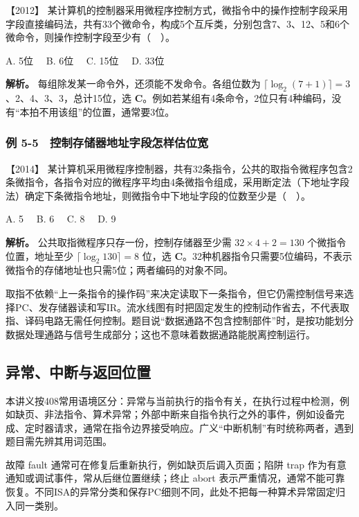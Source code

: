 \noindent{}【2012】 某计算机的控制器采用微程序控制方式，微指令中的操作控制字段采用字段直接编码法，共有33个微命令，构成5个互斥类，分别包含7、3、12、5和6个微命令，则操作控制字段至少有（　）。

A. 5位　 B. 6位　 C. 15位　 D. 33位


\textbf{解析。} 每组除发某一命令外，还须能不发命令。各组位数为 \(\lceil\log_2(7+1)\rceil=3\)、2、4、3、3，总计15位，选 \textbf{C}。例如若某组有4条命令，2位只有4种编码，没有``本拍不用该组''的位置，通常要3位。

\subsubsection{例 5-5　控制存储器地址字段怎样估位宽}\label{co-ex5-5}

\noindent{}【2014】 某计算机采用微程序控制器，共有32条指令，公共的取指令微程序包含2条微指令，各指令对应的微程序平均由4条微指令组成，采用断定法（下地址字段法）确定下条微指令地址，则微指令中下地址字段的位数至少是（　）。

A. 5　 B. 6　 C. 8　 D. 9


\textbf{解析。} 公共取指微程序只存一份，控制存储器至少需 \(32\times4+2=130\) 个微指令位置，地址至少 \(\lceil\log_2 130\rceil=8\) 位，选 \textbf{C}。32种机器指令只需要5位编码，不表示微指令的存储地址也只需5位；两者编码的对象不同。

取指不依赖``上一条指令的操作码''来决定读取下一条指令，但它仍需控制信号来选择PC、发存储器读和写IR。流水线图有时把固定发生的控制动作省去，不代表取指、译码电路无需任何控制。题目说``数据通路不包含控制部件''时，是按功能划分数据处理通路与信号生成部分；这也不意味着数据通路能脱离控制运行。

\subsection{异常、中断与返回位置}\label{co-05-05}

本讲义按408常用语境区分：异常与当前执行的指令有关，在执行过程中检测，例如缺页、非法指令、算术异常；外部中断来自指令执行之外的事件，例如设备完成、定时器请求，通常在指令边界接受响应。广义``中断机制''有时统称两者，遇到题目需先辨其用词范围。

故障 fault 通常可在修复后重新执行，例如缺页后调入页面；陷阱 trap 作为有意通知或调试事件，常从后继位置继续；终止 abort 表示严重情况，通常不能可靠恢复。不同ISA的异常分类和保存PC细则不同，此处不把每一种算术异常固定归入同一类别。

